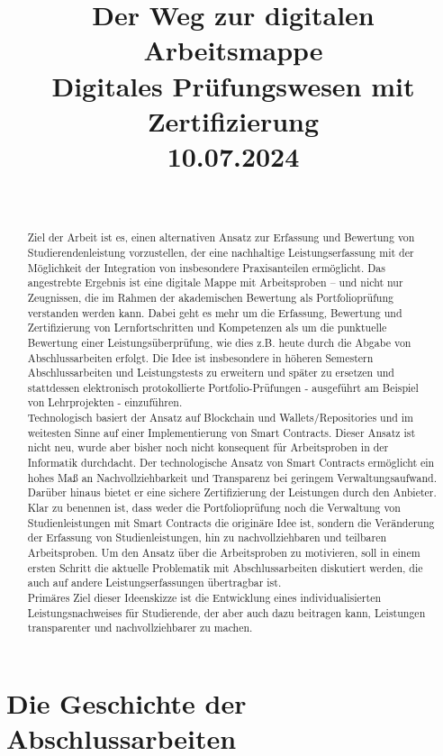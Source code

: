 \documentclass[conference]{IEEEtran}
\title{Der Weg zur digitalen Arbeitsmappe\\[1mm] \large Digitales Prüfungswesen mit Zertifizierung\\[2mm]10.07.2024}
\author{
    \IEEEauthorblockN{Martin Becke\IEEEauthorrefmark{1}\textsuperscript{\textdagger}, Julia Padberg\IEEEauthorrefmark{1}\textsuperscript{\textasteriskcentered}}\\
    \IEEEauthorblockA{\IEEEauthorrefmark{1} NahLab! HAW Hamburg\\
    \textsuperscript{\textdagger}Martin.Becke@haw-hamburg.de, \textsuperscript{\textasteriskcentered}Julia.Padberg@haw-hamburg.de}
}
\begin{document}
\maketitle

\begin{abstract}
Ziel der Arbeit ist es, einen alternativen Ansatz zur Erfassung und Bewertung von Studierendenleistung vorzustellen, der eine nachhaltige Leistungserfassung mit der Möglichkeit der Integration von insbesondere Praxisanteilen ermöglicht. Das angestrebte Ergebnis ist eine digitale Mappe mit Arbeitsproben -- und nicht nur Zeugnissen, die im Rahmen der akademischen Bewertung als Portfolioprüfung verstanden werden kann. Dabei geht es mehr um die Erfassung, Bewertung und Zertifizierung von Lernfortschritten und Kompetenzen als um die punktuelle Bewertung einer Leistungsüberprüfung, wie dies  z.B. heute durch die Abgabe von Abschlussarbeiten erfolgt. 
Die Idee ist insbesondere in höheren Semestern Abschlussarbeiten und Leistungstests zu erweitern und später zu ersetzen und stattdessen elektronisch protokollierte Portfolio-Prüfungen - ausgeführt am Beispiel von Lehrprojekten - einzuführen.
\\
Technologisch basiert der Ansatz auf Blockchain und Wallets/Repositories und im weitesten Sinne auf einer Implementierung von Smart Contracts. Dieser Ansatz ist nicht neu, wurde aber bisher noch nicht konsequent für Arbeitsproben in der Informatik durchdacht. Der technologische Ansatz von Smart Contracts ermöglicht ein hohes Maß an Nachvollziehbarkeit und Transparenz bei geringem Verwaltungsaufwand. Darüber hinaus bietet er eine sichere Zertifizierung der Leistungen durch den Anbieter. Klar zu benennen ist, dass weder die Portfolioprüfung noch die Verwaltung von Studienleistungen mit Smart Contracts die originäre Idee ist, sondern die Veränderung der Erfassung von Studienleistungen, hin zu nachvollziehbaren und teilbaren Arbeitsproben. Um den Ansatz über die Arbeitsproben zu motivieren, soll in einem ersten Schritt die aktuelle Problematik mit Abschlussarbeiten diskutiert werden, die auch auf andere Leistungserfassungen übertragbar ist. 
\\
Primäres Ziel dieser Ideenskizze ist die Entwicklung eines individualisierten Leistungsnachweises für Studierende, der aber auch dazu beitragen kann, Leistungen transparenter und nachvollziehbarer zu machen.
\end{abstract}

\section{Die Geschichte der Abschlussarbeiten}
\end{document}
